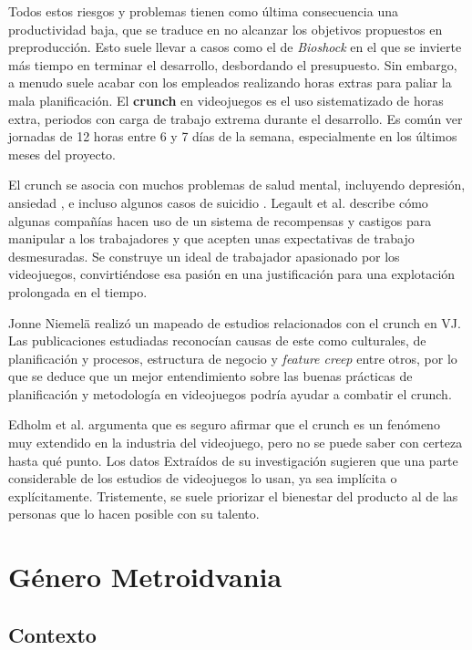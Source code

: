 Todos estos riesgos y problemas tienen como última consecuencia una productividad baja, que se traduce en no alcanzar los objetivos propuestos en preproducción. Esto suele llevar a casos como el de \textit{Bioshock} en el que se invierte más tiempo en terminar el desarrollo, desbordando el presupuesto. Sin embargo, a menudo suele acabar con los empleados realizando horas extras para paliar la mala planificación. El \textbf{crunch} en videojuegos es el uso sistematizado de horas extra, periodos con carga de trabajo extrema durante el desarrollo. Es común ver jornadas de 12 horas entre 6 y 7 días de la semana, especialmente en los últimos meses del proyecto.

El crunch se asocia con muchos problemas de salud mental, incluyendo depresión, ansiedad \cite{anderson}, e incluso algunos casos de suicidio \cite{kotakusuicide}. Legault et al. \cite{legault} describe cómo algunas compañías hacen uso de un sistema de recompensas y castigos para manipular a los trabajadores y que acepten unas expectativas de trabajo desmesuradas. Se construye un ideal de trabajador apasionado por los videojuegos, convirtiéndose esa pasión en una justificación para una explotación prolongada en el tiempo.

Jonne Niemelä \cite{nimela} realizó un mapeado de estudios relacionados con el crunch en VJ. Las publicaciones estudiadas reconocían causas de este como culturales, de planificación y procesos, estructura de negocio y \textit{feature creep} entre otros, por lo que se deduce que un mejor entendimiento sobre las buenas prácticas de planificación y metodología en videojuegos podría ayudar a combatir el crunch.

Edholm et al. \cite{edholm} argumenta que es seguro afirmar que el crunch es un fenómeno muy extendido en la industria del videojuego, pero no se puede saber con certeza hasta qué punto. Los datos Extraídos de su investigación sugieren que una parte considerable de los estudios de videojuegos lo usan, ya sea implícita o explícitamente. Tristemente, se suele priorizar el bienestar del producto al de las personas que lo hacen posible con su talento.

\section{Género Metroidvania}

\subsection{Contexto}

